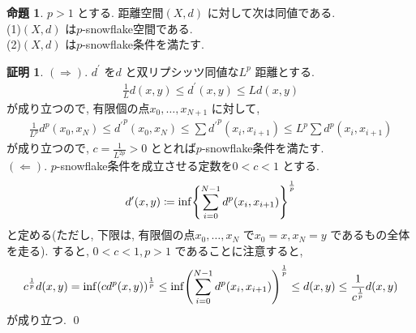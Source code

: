 \documentclass[10pt, fleqn, label-section=none]{bxjsarticle}
\theoremstyle{definition}
\newtheorem{prop}[dfn]{命題}
\newtheorem*{pf*}{証明}
\newcommand{\paren}[1]{\mleft( #1\mright )}
\newcommand{\cbra}[1]{\mleft\{#1\mright\}}
\newcommand{\naraba}{\Rightarrow}
\newcommand{\gyaku}{\Leftarrow}
\renewcommand{\;}{\, ; \,}
\begin{document}
\begin{prop}$p> 1$ とする. 距離空間$(X, d)$ に対して次は同値である. \\
(1)$(X, d)$ は$p$-snowflake空間である. \\
(2)$(X, d)$ は$p$-snowflake条件を満たす. 

\end{prop}
\begin{pf*}$(\naraba)$. $d^\prime$ を$d$ と双リプシッツ同値な$L^p$ 距離とする. 
\begin{align*} \frac{1}{L} d(x, y) \leq d^\prime (x, y) \leq L d(x, y)\end{align*}
が成り立つので, 有限個の点$x_0, \ldots, x_{N + 1}$ に対して, 
\begin{align*}  \frac{1}{L^p} d^p(x_0, x_N)  \leq  {d^\prime}^p (x_0, x_N) \leq \sum {d ^\prime } ^p(x_i, x_{i + 1}) \leq L^p \sum d^p(x_i, x_{i + 1}) \end{align*}
が成り立つので, $c = \frac{1}{L^{2p}} > 0$ ととれば$p$-snowflake条件を満たす. \\
$(\gyaku)$. $p$-snowflake条件を成立させる定数を$0 < c < 1$ とする. 
\begin{align*} d^\prime(x, y) \coloneqq \inf \cbra{ \sum_{i = 0}^{N-1} d^p(x_i, x_{i + 1})}^{\frac{1}{p}}    \end{align*}
と定める(ただし, 下限は, 有限個の点$x_0, \ldots, x_N$ で$x_0 = x, x_N = y$ であるもの全体を走る). すると, $0 < c < 1, p > 1$ であることに注意すると, 
\begin{align*} c^{\frac{1}{p}} d(x, y) =  \inf \paren{c d^p(x, y)}^{\frac{1}{p}} \leq \inf \paren{ \sum_{i = 0}^{N-1} d^p(x_i, x_{i + 1})}^{\frac{1}{p}}   \leq d(x, y) \leq \frac{1}{c^{\frac{1}{p} }} d(x, y) \end{align*}
が成り立つ. 
\qed
\end{pf*}
\end{document}
